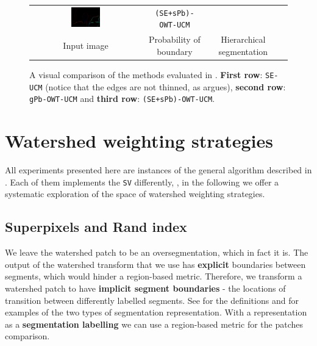 \begin{figure}[t]
\begin{center}
\begin{tabular}{ c c c l }
  \includegraphics[width=0.28\textwidth]{images/experiments/SE_sPb-OWT-UCM/eagle_(SE_sPb)-OWT-UCM_ucm_imageSize.png} &
  {\tiny \tt (SE+sPb)-OWT-UCM} \\
  Input image & Probability of boundary & Hierarchical segmentation & \\
  \end{tabular}
\end{center}
\caption[{\tt SE-UCM}, {\tt gPb-OWT-UCM} and {\tt (SE+sPb)-OWT-UCM}: a visual comparison]{A visual comparison of the methods evaluated in . {\bf First row}: {\tt SE-UCM} (notice that the edges %
are not thinned, as  argues), {\bf second row}: {\tt gPb-OWT-UCM} and {\bf third row}: {\tt (SE+sPb)-OWT-UCM}.}
\label{fig:SE_sPb-OWT-UCM-visual}
\end{figure}


\section[Watershed weighting strategies]{Watershed weighting strategies}%
\label{sec:ch5-structured-voting}
All experiments presented here are instances of the general algorithm described in . Each of them implements the {\tt SV} differently, \ie, in the following we offer a systematic exploration of the space of watershed weighting strategies.

\subsection{Superpixels and Rand index}
\label{sec:ch5-superpixels-and-RI}
We leave the watershed patch to be an oversegmentation, which in fact it is. The output of the watershed transform that we use has {\bf explicit} %
boundaries between segments, which would hinder a region-based metric. Therefore, we transform a watershed patch to have {\bf implicit segment boundaries} - the locations of transition between differently labelled segments. See  for the definitions and  for examples of the two types of segmentation representation. With a representation as a {\bf segmentation labelling} we can use a region-based metric for the patches comparison.

